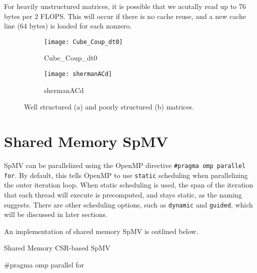 For heavily unstructured matrices, it is possible that we acutally read up to 76 bytes per 2 FLOPS. This will occur if there is no cache reuse, and a new cache line (64 bytes) is loaded for each nonzero.


\begin{figure}[H]
    \centering
    \begin{subfigure}[t]{0.45\textwidth}
        \centering
        \texttt{[image: Cube\_Coup\_dt0]}
        \caption{Cube\_Coup\_dt0}
    \end{subfigure}
    \hfill
    \begin{subfigure}[t]{0.45\textwidth}
        \centering
        \texttt{[image: shermanACd]}
        \caption{shermanACd}
    \end{subfigure}
    \caption{Well structured (a) and poorly structured (b) matrices.}
    \label{fig:Cube_Coup_dt0}
\end{figure}

\section{Shared Memory SpMV}
SpMV can be parallelized using the OpenMP directive \texttt{\#pragma omp parallel for}. By default, this tells OpenMP to use \texttt{static} scheduling when parallelizing the outer iteration loop. When static scheduling is used, the span of the iteration that each thread will execute is precomputed, and stays static, as the naming suggests. There are other scheduling options, such as \texttt{dynamic} and \texttt{guided}, which will be discussed in later sections.
\medskip

An implementation of shared memory SpMV is outlined below.
\medskip

\begin{algorithm}[H]
    \caption{Shared Memory CSR-based SpMV}
    \SetAlgoVlined

    \#pragma omp parallel for\\
    \label{alg:sharedmemoryspmv}
\end{algorithm}

